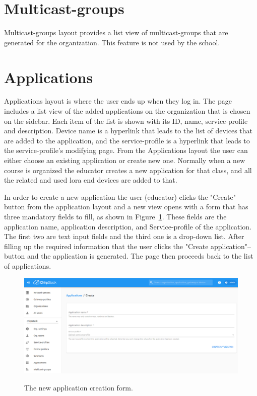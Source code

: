 \section{Multicast-groups}
Multicast-groups layout provides a list view of multicast-groups that are generated for the organization.
This feature is not used by the school.

\section{Applications}
Applications layout is where the user ends up when they log in.
The page includes a list view of the added applications on the organization that is chosen on the sidebar.
Each item of the list is shown with its ID, name, service-profile and description.
Device name is a hyperlink that leads to the list of devices that are added to the application, and the service-profile is a hyperlink that leads to the service-profile's modifying page.
From the Applications layout the user can either choose an existing application or create new one.
Normally when a new course is organized the educator creates a new application for that class, and all the related and used \gls{lora} end devices are added to that.

In order to create a new application the user (educator) clicks the "Create"--button from the application layout and a new view opens with a form that has three mandatory fields to fill, as shown in Figure~\ref{fig:ChirpStack_new_application}.
These fields are the application name, application description, and Service-profile of the application.
The first two are text input fields and the third one is a drop-down list.
After filling up the required information that the user clicks the "Create application"--button and the application is generated.
The page then proceeds back to the list of applications.

\begin{figure}[ht]
  \centering
  {\includegraphics[width=\textwidth]{illustration/ChirpStack_new_application.png}}
  \caption{The new application creation form.}
  \label{fig:ChirpStack_new_application}
\end{figure}

